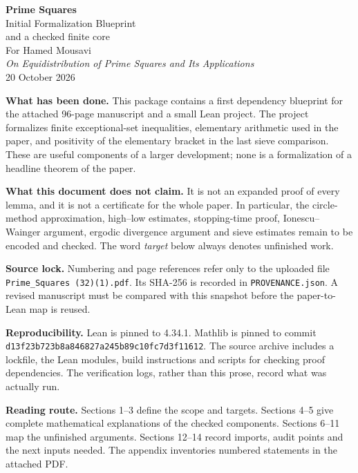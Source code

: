 \documentclass[11pt]{article}
\newcommand{\lean}[1]{\nolinkurl{#1}}
\newcommand{\page}{\newpage}
\begin{document}
\begin{center}
{\LARGE\bfseries\color{ink}Prime Squares}\\[6pt]
{\Large Initial Formalization Blueprint}\\[4pt]
{\large and a checked finite core}\\[18pt]
For Hamed Mousavi\\
\emph{On Equidistribution of Prime Squares and Its Applications}\\[10pt]
20 October 2026
\end{center}
\vspace{12pt}
\textbf{What has been done.} This package contains a first dependency blueprint for the
attached 96-page manuscript and a small Lean project. The project formalizes finite
exceptional-set inequalities, elementary arithmetic used in the paper, and positivity
of the elementary bracket in the last sieve comparison. These are useful components
of a larger development; none is a formalization of a headline theorem of the paper.

\textbf{What this document does not claim.} It is not an expanded proof of every lemma,
and it is not a certificate for the whole paper. In particular, the circle-method
approximation, high--low estimates, stopping-time proof, Ionescu--Wainger argument,
ergodic divergence argument and sieve estimates remain to be encoded and checked.
The word \emph{target} below always denotes unfinished work.

\textbf{Source lock.} Numbering and page references refer only to the uploaded file
\lean{Prime_Squares (32)(1).pdf}. Its SHA-256 is recorded in
\lean{PROVENANCE.json}. A revised manuscript must be compared with this snapshot
before the paper-to-Lean map is reused.

\textbf{Reproducibility.} Lean is pinned to 4.34.1. Mathlib is pinned to commit
\lean{d13f23b723b8a846827a245b89c10fc7d3f11612}. The source archive includes a lockfile,
the Lean modules, build instructions and scripts for checking proof dependencies.
The verification logs, rather than this prose, record what was actually run.

\textbf{Reading route.} Sections 1--3 define the scope and targets. Sections 4--5 give
complete mathematical explanations of the checked components. Sections 6--11 map
the unfinished arguments. Sections 12--14 record imports, audit points and the next
inputs needed. The appendix inventories numbered statements in the attached PDF.

\page
\tableofcontents
\end{document}
